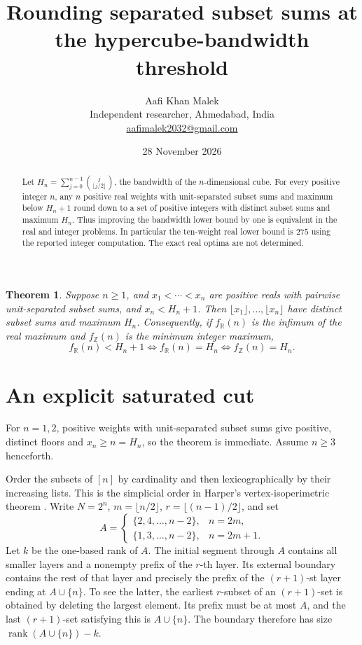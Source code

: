 \documentclass[11pt,letterpaper]{article}
\title{Rounding separated subset sums at the hypercube-bandwidth threshold}
\author{Aafi Khan Malek\\ \small Independent researcher, Ahmedabad, India\\
\small\href{mailto:aafimalek2032@gmail.com}{aafimalek2032@gmail.com}}
\date{28 November 2026}
\newtheorem{theorem}{Theorem}
\begin{document}
\maketitle
\begin{abstract}
Let \(H_n=\sum_{j=0}^{n-1}\binom{j}{\lfloor j/2\rfloor}\), the
bandwidth of the \(n\)-dimensional cube. For every positive integer \(n\), any
\(n\) positive real weights with unit-separated subset sums and
maximum below \(H_n+1\) round down to a set of positive integers
with distinct subset sums and maximum \(H_n\). Thus improving the
bandwidth lower bound by one is equivalent in the real and
integer problems. In particular the ten-weight real lower bound
is \(275\) using the reported integer computation. The exact real
optima are not determined.
\end{abstract}

\begin{theorem}\label{thm:round}
Suppose \(n\ge1\), and \(x_1<\cdots<x_n\) are positive reals with
pairwise unit-separated subset sums, and \(x_n<H_n+1\).
Then \(\lfloor x_1\rfloor,\ldots,\lfloor x_n\rfloor\) have
distinct subset sums and maximum \(H_n\).
Consequently, if \(f_{\mathbb R}(n)\) is the infimum of the real
maximum and \(f_{\mathbb Z}(n)\) is the minimum integer maximum,
\[
 f_{\mathbb R}(n)<H_n+1
 \iff f_{\mathbb R}(n)=H_n
 \iff f_{\mathbb Z}(n)=H_n .
\]
\end{theorem}

\section{An explicit saturated cut}
For \(n=1,2\), positive weights with unit-separated subset sums
give positive, distinct floors and \(x_n\ge n=H_n\), so the
theorem is immediate. Assume \(n\ge3\) henceforth.

Order the subsets of \([n]\) by cardinality and then lexicographically
by their increasing lists. This is the simplicial order in Harper's
vertex-isoperimetric theorem \cite{harper}. Write \(N=2^n\),
\(m=\lfloor n/2\rfloor\), \(r=\lfloor(n-1)/2\rfloor\), and set
\[
 A=\begin{cases}
 \{2,4,\ldots,n-2\},&n=2m,\\
 \{1,3,\ldots,n-2\},&n=2m+1.
 \end{cases}
\]
Let \(k\) be the one-based rank of \(A\). The initial segment through
\(A\) contains all smaller layers and a nonempty prefix of the
\(r\)-th layer. Its external boundary contains the rest of that layer
and precisely the prefix of the \((r+1)\)-st layer ending at
\(A\cup\{n\}\). To see the latter, the earliest \(r\)-subset of an
\((r+1)\)-set is obtained by deleting the largest element.
Its prefix must be at most \(A\), and the last \((r+1)\)-set
satisfying this is \(A\cup\{n\}\). The boundary therefore has size
\(\operatorname{rank}(A\cup\{n\})-k\).
\end{document}
